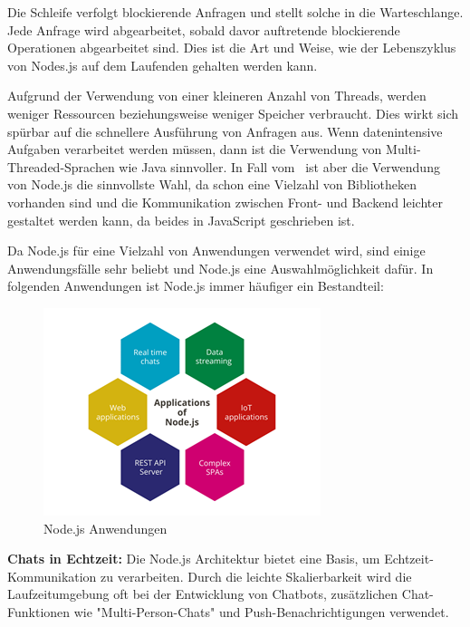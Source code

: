 Die Schleife verfolgt blockierende Anfragen und stellt solche in die Warteschlange. Jede Anfrage wird abgearbeitet, sobald davor auftretende blockierende Operationen abgearbeitet sind. Dies ist die Art und Weise, wie der Lebenszyklus von Nodes.js auf dem Laufenden gehalten werden kann. \cite{NodeJsArch} \cite{NodeJsArch2}

Aufgrund der Verwendung von einer kleineren Anzahl von Threads, werden weniger Ressourcen beziehungsweise weniger Speicher verbraucht. Dies wirkt sich spürbar auf die schnellere Ausführung von Anfragen aus. Wenn datenintensive Aufgaben verarbeitet werden müssen, dann ist die Verwendung von Multi-Threaded-Sprachen wie Java sinnvoller. In Fall vom \ZELIA\ ist aber die Verwendung von Node.js die sinnvollste Wahl, da schon eine Vielzahl von Bibliotheken vorhanden sind und die Kommunikation zwischen Front- und Backend leichter gestaltet werden kann, da beides in JavaScript geschrieben ist. \cite{Arocom} \cite{NodeJsArch2} \cite{NodeJsArch}


Da Node.js für eine Vielzahl von Anwendungen verwendet wird, sind einige Anwendungsfälle sehr beliebt und Node.js eine Auswahlmöglichkeit dafür. In folgenden Anwendungen ist Node.js immer häufiger ein Bestandteil:

\begin{figure}[H]
    \centering
    \includegraphics{media/NodeJs/NodeJsAnwendungen.png}
    \caption{Node.js Anwendungen \cite{AnwendungenFoto}}
\end{figure}

    \textbf{Chats in Echtzeit:}
    Die Node.js Architektur bietet eine Basis, um Echtzeit-Kommunikation zu verarbeiten. Durch die leichte Skalierbarkeit wird die Laufzeitumgebung oft bei der Entwicklung von Chatbots, zusätzlichen Chat-Funktionen wie "Multi-Person-Chats" und Push-Benachrichtigungen verwendet.

